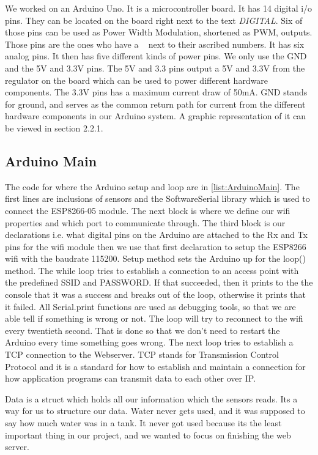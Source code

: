 \documentclass[a4paper,12pt,oneside,openright,titlepage]{book}
\begin{document}
We worked on an Arduino Uno. It is a microcontroller board. It has 14 digital i/o pins. They can be located on the board right next to the text \textit{DIGITAL}. Six of those pins can be used as Power Width Modulation, shortened as PWM, outputs. Those pins are the ones who have a ~ next to their ascribed numbers. It has six analog pins. It then has five different kinds of power pins. We only use the GND and the 5V and 3.3V pins. The 5V and 3.3 pins output a 5V and 3.3V from the regulator on the board which can be used to power different hardware components. The 3.3V pins has a maximum current draw of 50mA. GND stands for ground, and serves as the common return path for current from the different hardware components in our Arduino system. A graphic representation of it can be viewed in section 2.2.1. 

\subsection{Arduino Main}
The code for where the Arduino setup and loop are in \ref{list:ArduinoMain}. The first lines are inclusions of sensors and the SoftwareSerial library which is used to connect the ESP8266-05 module. The next block is where we define our wifi properties and which port to communicate through. The third block is our declarations i.e. what digital pins on the Arduino are attached to the Rx and Tx pins for the wifi module then we use that first declaration to setup the ESP8266 wifi with the baudrate 115200. Setup method sets the Arduino up for the loop() method. The while loop tries to establish a connection to an access point with the predefined SSID and PASSWORD. If that succeeded, then it prints to the the console that it was a success and breaks out of the loop, otherwise it prints that it failed. All Serial.print functions are used as debugging tools, so that we are able tell if something is wrong or not. The loop will try to reconnect to the wifi every twentieth second. That is done so that we don't need to restart the Arduino every time something goes wrong. The next loop tries to establish a TCP connection to the Webserver. TCP stands for Transmission Control Protocol and it is a standard for how to establish and maintain a connection for how application programs can transmit data to each other over IP. 

Data is a struct which holds all our information which the sensors reads. Its a way for us to structure our data. Water never gets used, and it was supposed to say how much water was in a tank. It never got used because its the least important thing in our project, and we wanted to focus on finishing the web server.
\end{document}
